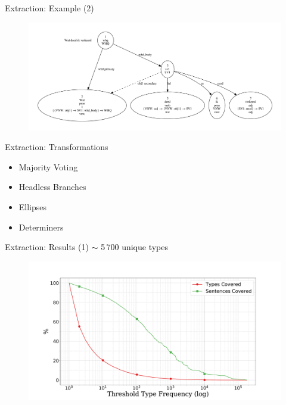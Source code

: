 \documentclass{beamer}
\begin{document}
{
\begin{frame}{Extraction: Example (2)}
	\begin{figure}
		\includegraphics[scale=0.3]{deed2.pdf}
	\end{figure}
\end{frame}
}

\begin{frame}{Extraction: Transformations}
	\begin{itemize}
		\item Majority Voting
		\item Headless Branches
		\item Ellipses
		\item Determiners
	\end{itemize}
\end{frame}

{
\begin{frame}{Extraction: Results (1)}
	\centering
	\vfill
	\textcolor{black}{$\sim$ 5\,700 unique types}
	\begin{figure}
		\includegraphics[scale=0.24]{sparsity.pdf}
	\end{figure}
\end{frame}
}
\end{document}
